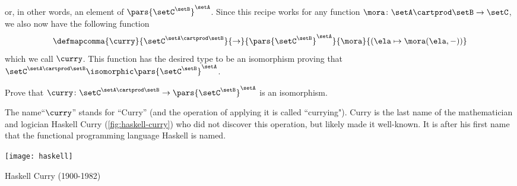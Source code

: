 or, in other words, an element of $\pars{\setC^\setB}^\setA$. Since this recipe works for any function $\mora \colon \setA \cartprod \setB \to \setC$, we also now have the following function
\begin{equation}
\defmapcomma{
         \curry
        }{
           \setC^{\setA \cartprod \setB}
        }{
           \to
        }{
           \pars{\setC^\setB}^\setA 
        }{
           \mora
        }{
           (\ela \mapsto \mora ( \ela, -))
           }
\end{equation}
which we call $\curry$. This function has the desired type to be an isomorphism proving that $\setC^{\setA \cartprod \setB}  \isomorphic \pars{\setC^\setB}^\setA$.

\begin{exercise}\label{ex:currying-is-an-iso}
Prove that  $\curry \colon \setC^{\setA \cartprod \setB} \to \pars{\setC^\setB}^\setA$ is an isomorphism. 
\end{exercise}

\begin{solution}
\end{solution}

The name``$\curry$'' stands for ``Curry'' (and the operation of applying it is called ``currying"). Curry is the last name of the mathematician and logician Haskell Curry (\cref{fig:haskell-curry}) who did not discover this operation, but likely made it well-known. It is after his first name that the functional programming language Haskell is named. 

\begin{marginfigure}
    \texttt{[image: haskell]}
    \caption{Haskell Curry (1900-1982)}
    \label{fig:haskell-curry}
\end{marginfigure}

